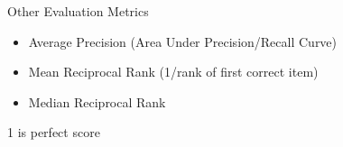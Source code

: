 \documentclass{beamer}
\begin{document}
\begin{frame}{Other Evaluation Metrics}

\begin{itemize}[label=$\vartriangleright$]

\item Average Precision (Area Under Precision/Recall Curve)

\item Mean Reciprocal Rank (1/rank of first correct item)

\item Median Reciprocal Rank

\end{itemize}

1 is perfect score

\end{frame}






\end{document}
